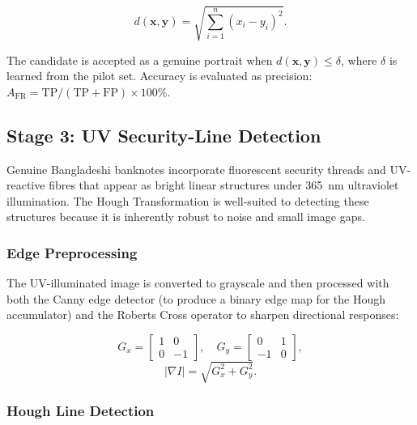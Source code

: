 \documentclass[10pt,a4paper,twocolumn,twoside]{article}
\begin{document}
\begin{equation}
  d(\mathbf{x},\mathbf{y})
    = \sqrt{\sum_{i=1}^{n}(x_i - y_i)^2}.
  \label{eq:euclidean}
\end{equation}

The candidate is accepted as a genuine portrait when
$d(\mathbf{x},\mathbf{y}) \leq \delta$, where $\delta$ is
learned from the pilot set. Accuracy is evaluated as precision:
$A_{\mathrm{FR}} = \mathrm{TP}/(\mathrm{TP}+\mathrm{FP})
\times 100\%$.

\subsection{Stage 3: UV Security-Line Detection}
\label{subsec:hough}

Genuine Bangladeshi banknotes incorporate fluorescent security
threads and UV-reactive fibres that appear as bright linear
structures under 365~nm ultraviolet illumination. The Hough
Transformation is well-suited to detecting these structures
because it is inherently robust to noise and small image gaps.

\subsubsection{Edge Preprocessing}

The UV-illuminated image is converted to grayscale and then
processed with both the Canny edge detector (to produce a binary
edge map for the Hough accumulator) and the Roberts Cross
operator to sharpen directional responses:

\begin{equation}
  G_x = \begin{bmatrix} 1 & 0 \\ 0 & -1 \end{bmatrix}\!, \quad
  G_y = \begin{bmatrix} 0 & 1 \\ -1 & 0 \end{bmatrix}\!,
  \label{eq:roberts}
\end{equation}
\begin{equation}
  \lvert\nabla I\rvert = \sqrt{G_x^2 + G_y^2}.
  \label{eq:gradient}
\end{equation}

\subsubsection{Hough Line Detection}
\end{document}

